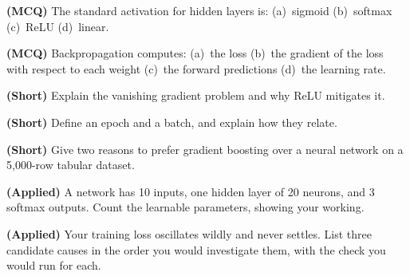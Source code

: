 \begin{reviewq}
  \item \textbf{(MCQ)} The standard activation for hidden layers is: (a)~sigmoid
        (b)~softmax (c)~ReLU (d)~linear.
  \item \textbf{(MCQ)} Backpropagation computes: (a)~the loss (b)~the gradient of
        the loss with respect to each weight (c)~the forward predictions
        (d)~the learning rate.
  \item \textbf{(Short)} Explain the vanishing gradient problem and why ReLU
        mitigates it.
  \item \textbf{(Short)} Define an epoch and a batch, and explain how they relate.
  \item \textbf{(Short)} Give two reasons to prefer gradient boosting over a neural
        network on a 5{,}000-row tabular dataset.
  \item \textbf{(Applied)} A network has 10 inputs, one hidden layer of 20 neurons,
        and 3 softmax outputs. Count the learnable parameters, showing your working.
  \item \textbf{(Applied)} Your training loss oscillates wildly and never settles.
        List three candidate causes in the order you would investigate them, with
        the check you would run for each.
\end{reviewq}

